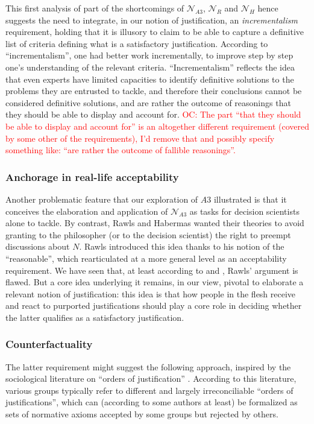 \documentclass[preprint, french, english, 11pt, authoryear]{elsarticle}%
\newcommand{\commentOC}[1]{\textcolor{red}{OC: #1}}
\begin{document}
This first analysis of part of the shortcomings of $\mathscr{N}_{A3}$, $\mathscr{N}_{R}$ and $\mathscr{N}_{H}$ hence suggests the need to integrate, in our notion of justification, an \emph{incrementalism} requirement, holding that it is illusory to claim to be able to capture a definitive list of criteria defining what is a satisfactory justification. According to “incrementalism”, one had better work incrementally, to improve step by step one's understanding of the relevant criteria. “Incrementalism” reflects the idea that even experts have limited capacities to identify definitive solutions to the problems they are entrusted to tackle, and therefore their conclusions cannot be considered definitive solutions, and are rather the outcome of reasonings that they should be able to display and account for. \commentOC{The part “that they should be able to display and account for” is an altogether different requirement (covered by some other of the requirements), I’d remove that and possibly specify something like: “are rather the outcome of fallible reasonings”.}

\subsubsection{Anchorage in real-life acceptability}
Another problematic feature that our exploration of $A3$ illustrated is that it conceives the elaboration and application of $\mathscr{N}_{A3}$ as tasks for decision scientists alone to tackle. By contrast, Rawls and Habermas wanted their theories to avoid granting to the philosopher (or to the decision scientist) the right to preempt discussions about $N$. Rawls introduced this idea thanks to his notion of the ``reasonable'', which \cite{estlund_democratic_2009} rearticulated at a more general level as an acceptability requirement. We have seen that, at least according to \cite{habermas_reconciliation_1995} and \cite{estlund_democratic_2009}, Rawls' argument is flawed. But a core idea underlying it remains, in our view, pivotal to elaborate a relevant notion of justification: this idea is that how people in the flesh receive and react to purported justifications should play a core role in deciding whether the latter qualifies as a satisfactory justification.

\subsubsection{Counterfactuality}
The latter requirement might suggest the following approach, inspired by the sociological literature on “orders of justification” \citep{boltanski_justification_2006}. According to this literature, various groups typically refer to different and largely irreconciliable “orders of justifications”, which can (according to some authors at least) be formalized as sets of normative axioms accepted by some groups but rejected by others.
\end{document}
